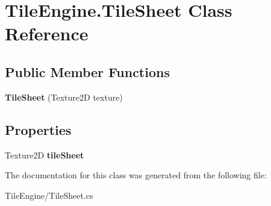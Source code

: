 \hypertarget{class_tile_engine_1_1_tile_sheet}{\section{Tile\-Engine.\-Tile\-Sheet Class Reference}
\label{da/d84/class_tile_engine_1_1_tile_sheet}
}
\subsection*{Public Member Functions}
\begin{DoxyCompactItemize}
\item 
\hypertarget{class_tile_engine_1_1_tile_sheet_a74fd1ec39c58a55b1494a6f5071c837d}{{\bfseries Tile\-Sheet} (Texture2\-D texture)}\label{da/d84/class_tile_engine_1_1_tile_sheet_a74fd1ec39c58a55b1494a6f5071c837d}

\end{DoxyCompactItemize}
\subsection*{Properties}
\begin{DoxyCompactItemize}
\item 
\hypertarget{class_tile_engine_1_1_tile_sheet_a6d1063b12cabd250a4f6a3a286e1e18e}{Texture2\-D {\bfseries tile\-Sheet}}\label{da/d84/class_tile_engine_1_1_tile_sheet_a6d1063b12cabd250a4f6a3a286e1e18e}

\end{DoxyCompactItemize}


The documentation for this class was generated from the following file\-:\begin{DoxyCompactItemize}
\item 
Tile\-Engine/Tile\-Sheet.\-cs\end{DoxyCompactItemize}
